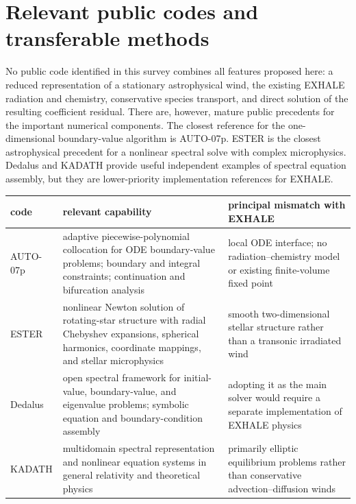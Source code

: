 \documentclass[english,a4paper]{my_memo}
\begin{document}
\section{Relevant public codes and transferable methods}
\label{sec:relatedcodes}

No public code identified in this survey combines all features proposed here:
a reduced representation of a stationary astrophysical wind, the existing
EXHALE radiation and chemistry, conservative species transport, and direct
solution of the resulting coefficient residual.  There are, however, mature
public precedents for the important numerical components.  The closest
reference for the one-dimensional boundary-value algorithm is AUTO-07p.  ESTER
is the closest astrophysical precedent for a nonlinear spectral solve with
complex microphysics.  Dedalus and KADATH provide useful independent examples
of spectral equation assembly, but they are lower-priority implementation
references for EXHALE.

\begin{center}\small
\begin{tabular}{@{}p{}p{}p{}@{}}
\toprule
code & relevant capability & principal mismatch with EXHALE \\
\midrule
AUTO-07p & adaptive piecewise-polynomial collocation for ODE boundary-value
  problems; boundary and integral constraints; continuation and bifurcation
  analysis & local ODE interface; no radiation--chemistry model or existing
  finite-volume fixed point \\
ESTER & nonlinear Newton solution of rotating-star structure with radial
  Chebyshev expansions, spherical harmonics, coordinate mappings, and stellar
  microphysics & smooth two-dimensional stellar structure rather than a
  transonic irradiated wind \\
Dedalus & open spectral framework for initial-value, boundary-value, and
  eigenvalue problems; symbolic equation and boundary-condition assembly &
  adopting it as the main solver would require a separate implementation of
  EXHALE physics \\
KADATH & multidomain spectral representation and nonlinear equation systems in
  general relativity and theoretical physics & primarily elliptic equilibrium
  problems rather than conservative advection--diffusion winds \\
\bottomrule
\end{tabular}
\end{center}
\end{document}
